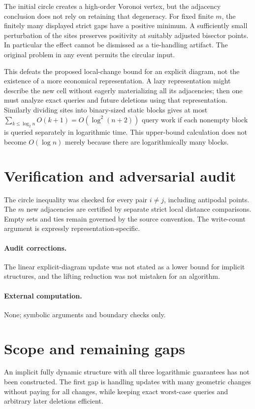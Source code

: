 \documentclass[11pt,a4paper]{article}
\begin{document}
The initial circle creates a high-order Voronoi vertex, but the adjacency
conclusion does not rely on retaining that degeneracy. For fixed finite $m$,
the finitely many displayed strict gaps have a positive minimum. A sufficiently
small perturbation of the sites preserves positivity at suitably adjusted
bisector points. In particular the effect cannot be dismissed as a tie-handling
artifact. The original problem in any event permits the circular input.

This defeats the proposed local-change bound for an explicit diagram, not the
existence of a more economical representation. A lazy representation might
describe the new cell without eagerly materializing all its adjacencies; then
one must analyze exact queries and future deletions using that representation.
Similarly dividing sites into binary-sized static blocks gives at most
$\sum_{k\le\log_2n}O(k+1)=O(\log^2(n+2))$ query work if each nonempty block
is queried separately in logarithmic time. This upper-bound calculation does
not become $O(\log n)$ merely because there are logarithmically many blocks.
\section{Verification and adversarial audit}
The circle inequality was checked for every pair $i\ne j$, including
antipodal points. The $m$ new adjacencies are certified by separate strict local
distance comparisons. Empty sets and ties remain governed by the source
convention. The write-count argument is expressly representation-specific.
\paragraph{Audit corrections.} The linear explicit-diagram update was not stated as a lower bound for implicit structures, and the lifting reduction was not mistaken for an algorithm.
\paragraph{External computation.} None; symbolic arguments and boundary checks only.
\section{Scope and remaining gaps}
An implicit fully dynamic structure with all three logarithmic guarantees
has not been constructed. The first gap is handling updates with many geometric
changes without paying for all changes, while keeping exact worst-case queries
and arbitrary later deletions efficient.
\end{document}
